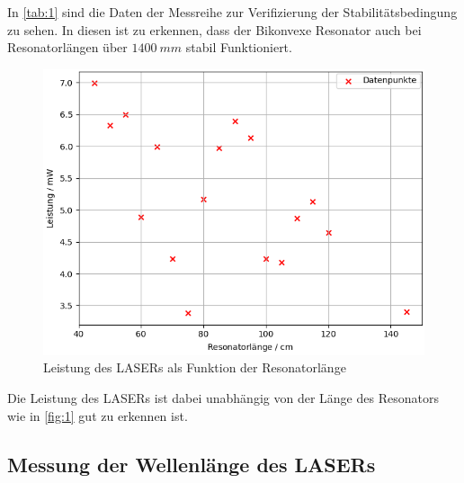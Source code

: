 \noindent
In \autoref{tab:1} sind die Daten der Messreihe zur Verifizierung der Stabilitätsbedingung zu sehen. In diesen ist zu erkennen, dass der Bikonvexe Resonator auch bei Resonatorlängen über $\SI{1400}{mm}$ stabil Funktioniert. 
\begin{figure}[H]
  \centering
  \includegraphics[width=0.6\linewidth]{plots/stab_bed_1.png}
  \caption{Leistung des LASERs als Funktion der Resonatorlänge}
  \label{fig:1}
\end{figure}
\noindent
Die Leistung des LASERs ist dabei unabhängig von der Länge des Resonators wie in \autoref{fig:1} gut zu erkennen ist.
\newpage
\subsection{Messung der Wellenlänge des LASERs}
\newpage
